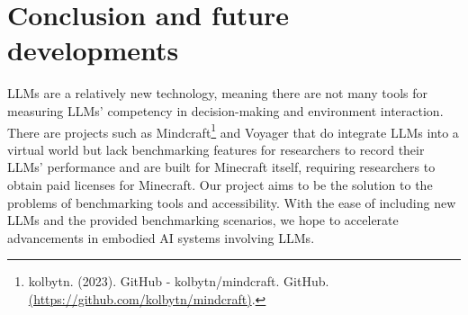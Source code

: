 \documentclass{article}
\begin{document}
\section{Conclusion and future developments}
LLMs are a relatively new technology, meaning there are not many tools for measuring LLMs' competency in decision-making and environment interaction.
There are projects such as Mindcraft\footnote{kolbytn. (2023). GitHub - kolbytn/mindcraft. GitHub. \url{(https://github.com/kolbytn/mindcraft)}.} and Voyager that do integrate LLMs into a virtual world but lack benchmarking features for researchers to record their LLMs' performance and are built for Minecraft itself, requiring researchers to obtain paid licenses for Minecraft.
Our project aims to be the solution to the problems of benchmarking tools and accessibility.
With the ease of including new LLMs and the provided benchmarking scenarios, we hope to accelerate advancements in embodied AI systems involving LLMs.
\end{document}
